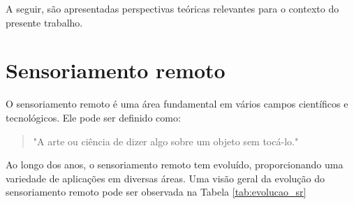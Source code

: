 A seguir, são apresentadas perspectivas teóricas relevantes para o contexto do presente
trabalho.
\section{Sensoriamento remoto}
O sensoriamento remoto é uma área fundamental em vários campos científicos e tecnológicos. Ele pode ser definido  como:
\begin{quote}
"A arte ou ciência de dizer algo sobre um objeto sem tocá-lo." \parencite[{p. 34}]{fischer1976}
\end{quote}

Ao longo dos anos, o sensoriamento remoto tem evoluído, proporcionando uma variedade de aplicações em diversas áreas. Uma visão geral da evolução do sensoriamento remoto pode ser observada na Tabela \ref{tab:evolucao_sr}

